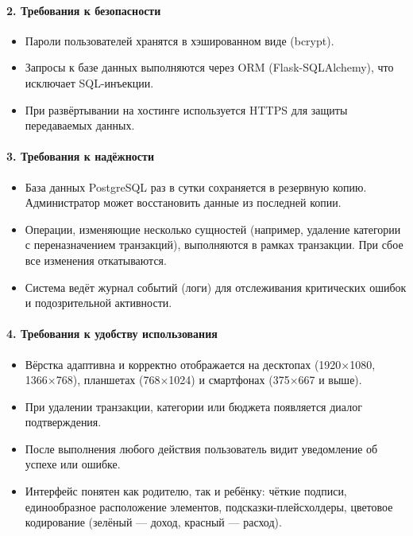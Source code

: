 \paragraph{2. Требования к безопасности}

\begin{itemize}
    \item Пароли пользователей хранятся в хэшированном виде (bcrypt).
    \item Запросы к базе данных выполняются через ORM (Flask-SQLAlchemy), что исключает SQL-инъекции.
    \item При развёртывании на хостинге используется HTTPS для защиты передаваемых данных.
\end{itemize}

\paragraph{3. Требования к надёжности}

\begin{itemize}
    \item База данных PostgreSQL раз в сутки сохраняется в резервную копию. Администратор может восстановить данные из последней копии.
    \item Операции, изменяющие несколько сущностей (например, удаление категории с переназначением транзакций), выполняются в рамках транзакции. При сбое все изменения откатываются.
    \item Система ведёт журнал событий (логи) для отслеживания критических ошибок и подозрительной активности.
\end{itemize}

\paragraph{4. Требования к удобству использования}

\begin{itemize}
    \item Вёрстка адаптивна и корректно отображается на десктопах (1920×1080, 1366×768), планшетах (768×1024) и смартфонах (375×667 и выше).
    \item При удалении транзакции, категории или бюджета появляется диалог подтверждения.
    \item После выполнения любого действия пользователь видит уведомление об успехе или ошибке.
    \item Интерфейс понятен как родителю, так и ребёнку: чёткие подписи, единообразное расположение элементов, подсказки-плейсхолдеры, цветовое кодирование (зелёный — доход, красный — расход).
\end{itemize}

